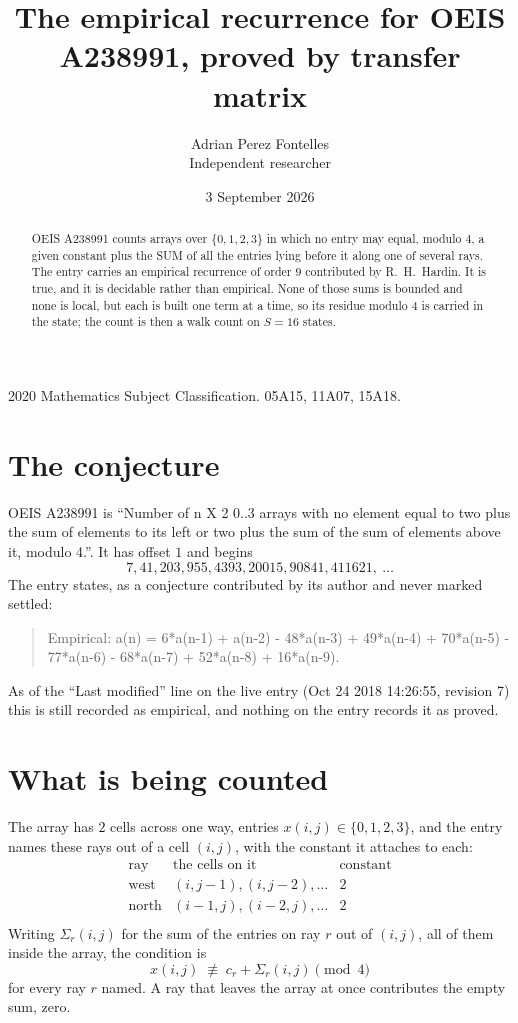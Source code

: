 \documentclass[11pt,a4paper]{article}
\title{The empirical recurrence for OEIS A238991, proved by transfer matrix}
\author{Adrian Perez Fontelles\\ \small Independent researcher}
\date{3 September 2026}
\theoremstyle{plain}
\theoremstyle{definition}
\begin{document}
\maketitle

\begin{abstract}
OEIS A238991 counts arrays over $\{0,1,2,3\}$ in which no entry may equal, modulo $4$, a given
constant plus the SUM of all the entries lying before it along one of several rays. The entry
carries an empirical recurrence of order $9$ contributed by R.~H.~Hardin. It is true, and
it is decidable rather than empirical. None of those sums is bounded and none is local, but
each is built one term at a time, so its residue modulo $4$ is carried in the state; the
count is then a walk count on $S=16$ states.
\end{abstract}

\noindent\small 2020 Mathematics Subject Classification. 05A15, 11A07, 15A18.\normalsize

\section{The conjecture}

OEIS A238991 is ``Number of n X 2 0..3 arrays with no element equal to two plus the sum of elements to its left or two plus the sum of the sum of elements above it, modulo 4.''. It has offset $1$ and begins
\[
7, 41, 203, 955, 4393, 20015, 90841, 411621,\ \dots
\]
The entry states, as a conjecture contributed by its author and never marked settled:
\begin{quote}
Empirical: a(n) = 6*a(n-1) + a(n-2) - 48*a(n-3) + 49*a(n-4) + 70*a(n-5) - 77*a(n-6) - 68*a(n-7) + 52*a(n-8) + 16*a(n-9).
\end{quote}
As of the ``Last modified'' line on the live entry (Oct 24 2018 14:26:55, revision 7) this is still
recorded as empirical, and nothing on the entry records it as proved.

\section{What is being counted}

The array has $2$ cells across one way, entries $x(i,j)\in\{0,1,2,3\}$, and the entry names these
rays out of a cell $(i,j)$, with the constant it attaches to each:
\[
\begin{array}{lll}
\text{ray} & \text{the cells on it} & \text{constant} \\[2pt]
\text{west} & (i,j-1),(i,j-2),\dots & 2 \\
\text{north} & (i-1,j),(i-2,j),\dots & 2 \\
\end{array}
\]
Writing $\Sigma_r(i,j)$ for the sum of the entries on ray $r$ out of $(i,j)$, all of them
inside the array, the condition is
\[
x(i,j)\;\not\equiv\;c_r+\Sigma_r(i,j) \pmod{4}
\]
for every ray $r$ named. A ray that leaves the array at once contributes the empty sum,
zero.
\end{document}
